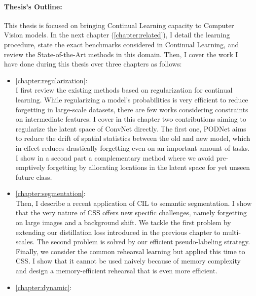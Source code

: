 \paragraph{Thesis's Outline:} This thesis is focused on bringing Continual Learning capacity to
Computer Vision models. In the next chapter (\autoref{chapter:related}), I detail the learning
procedure, state the exact benchmarks considered in Continual Learning, and review the
State-of-the-Art methods in this domain. Then, I cover the work I have done during this thesis over
three chapters as follows:

\begin{itemize}
      \item \autoref{chapter:regularization}: \\
            I first review the existing methods based on regularization for continual learning. While
            regularizing a model's probabilities is very efficient to reduce forgetting in large-scale
            datasets, there are few works considering constraints on intermediate features. I cover in this
            chapter two contributions aiming to regularize the latent space of \acs{ConvNet} directly. The
            first one, \acf{PODNet} aims to reduce the drift of spatial statistics between the old and new
            model, which in effect reduces drastically forgetting even on an important amount of tasks. I show in a
            second part a complementary method where we avoid pre-emptively forgetting by allocating
            locations in the latent space for yet unseen future class.
      \item \autoref{chapter:segmentation}: \\
            Then, I describe a recent application of \acf{CIL} to semantic segmentation. I show that
            the very nature of \acf{CSS} offers new specific challenges, namely forgetting on large
            images and a background shift. We tackle the first problem by extending our distillation
            loss introduced in the previous chapter to multi-scales. The second problem is solved by
            our efficient pseudo-labeling strategy. Finally, we consider the common rehearsal learning
            but applied this time to \ac{CSS}. I show that it cannot be used naively because of memory
            complexity and design a memory-efficient rehearsal that is even more efficient.
      \item \autoref{chapter:dynamic}: \\

\end{itemize}
